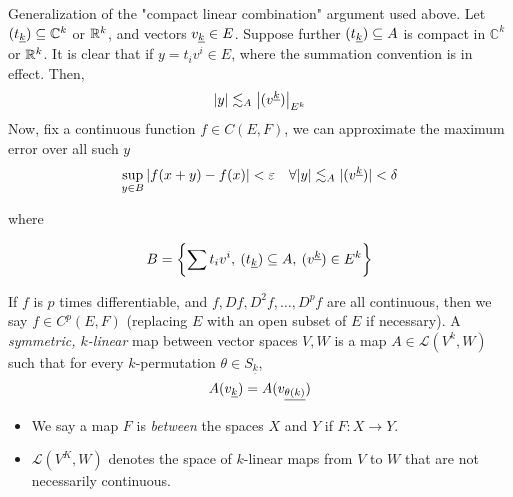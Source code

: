 \documentclass[../main-manifolds.tex]{subfiles}
\begin{document}
\begin{remark}
    Generalization of the "compact linear combination" argument used above. Let $(\UL{t}[k])\subseteq\mathbb{C}^k$ or $\mathbb{R}^k$, and vectors $\UL{v}[k]\in E$. Suppose further $(\UL{t}[k])\subseteq A$ is compact in $\mathbb{C}^k$ or ${\mathbb{R}^k}$. It is clear that if $y = t_iv^i\in E$, where the summation convention is in effect. Then,
    \[
        \abs{y}\lesssim_A \abs{(v^{\underline{k}})}_{E^k}
    \]
    Now, fix a continuous function $f\in C(E,F)$, we can approximate the maximum error over all such $y$
    \[
        \sup_{y\in B}\abs{f(x+y) - f(x)}< \varepsilon\quad\forall \abs{y}\lesssim_A\vert(v^{\underline{k}})\vert < \delta
    \]

    where

    \[
    B = \bigset{\sum t_iv^i,\: (\UL{t}[k])\subseteq A,\: (v^{\underline{k}})\in E^k }
    \]
\end{remark}

If $f$ is $p$ times differentiable, and $f, Df, D^2f, \ldots, D^pf$ are all continuous, then we say $f\in C^p(E,F)$ (replacing $E$ with an open subset of $E$ if necessary). A \emph{symmetric, $k$-linear} map between vector spaces $V,W$ is a map $A\in \mathcal{L}(V^k,W)$ such that for every $k$-permutation $\theta\in S_{\underline{k}}$, 
\[
    A(\Ul{v}[k]) = A(\Ul{v}[\theta(k)])    
\]
\begin{note}
    \begin{itemize}
        \item We say a map $F$ is \emph{between} the spaces $X$ and $Y$ if $F: X\to Y$. 
        \item $\mathcal{L}(V^K,W)$ denotes the space of $k$-linear maps from $V$ to $W$ that are not necessarily continuous. 
    \end{itemize}
\end{note}
\end{document}
